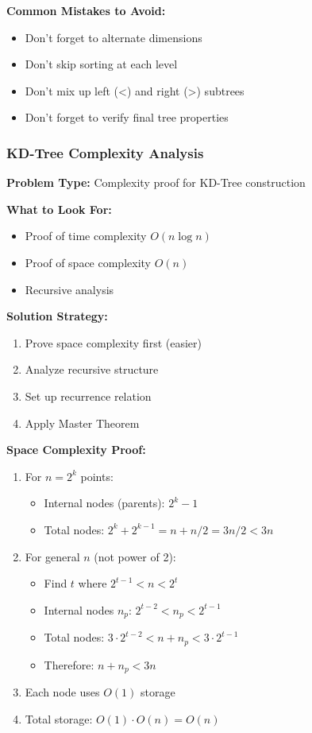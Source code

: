 \textbf{Common Mistakes to Avoid:}
\begin{itemize}[noitemsep,leftmargin=*]
    \item Don't forget to alternate dimensions
    \item Don't skip sorting at each level
    \item Don't mix up left (<) and right (>) subtrees
    \item Don't forget to verify final tree properties
\end{itemize}

\FloatBarrier

\subsubsection{KD-Tree Complexity Analysis}
\textbf{Problem Type:} Complexity proof for KD-Tree construction

\textbf{What to Look For:}
\begin{itemize}[noitemsep,leftmargin=*]
    \item Proof of time complexity $O(n\log n)$
    \item Proof of space complexity $O(n)$
    \item Recursive analysis
\end{itemize}

\textbf{Solution Strategy:}
\begin{enumerate}[leftmargin=*,noitemsep]
    \item Prove space complexity first (easier)
    \item Analyze recursive structure
    \item Set up recurrence relation
    \item Apply Master Theorem
\end{enumerate}

\textbf{Space Complexity Proof:}
\begin{enumerate}[leftmargin=*,noitemsep]
    \item For $n = 2^k$ points:
        \begin{itemize}[noitemsep,topsep=0pt]
            \item Internal nodes (parents): $2^k - 1$
            \item Total nodes: $2^k + 2^{k-1} = n + n/2 = 3n/2 < 3n$
        \end{itemize}
    \item For general $n$ (not power of 2):
        \begin{itemize}[noitemsep,topsep=0pt]
            \item Find $t$ where $2^{t-1} < n < 2^t$
            \item Internal nodes $n_p$: $2^{t-2} < n_p < 2^{t-1}$
            \item Total nodes: $3 \cdot 2^{t-2} < n + n_p < 3 \cdot 2^{t-1}$
            \item Therefore: $n + n_p < 3n$
        \end{itemize}
    \item Each node uses $O(1)$ storage
    \item Total storage: $O(1) \cdot O(n) = O(n)$
\end{enumerate}

